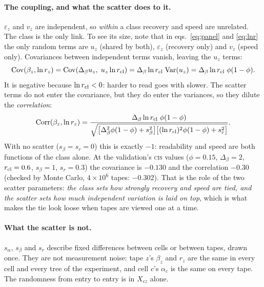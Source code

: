 \paragraph{The coupling, and what the scatter does to it.} $\varepsilon_z$ and $v_z$ are independent,
so \emph{within} a class recovery and speed are unrelated. The class is the only link. To see its size,
note that in eqs.~\eqref{eq:panel} and \eqref{eq:lnr} the only random terms are $u_z$ (shared by both),
$\varepsilon_z$ (recovery only) and $v_z$ (speed only). Covariances between independent terms vanish,
leaving the $u_z$ terms:
\begin{equation}
  \mathrm{Cov}(\beta_z,\ln r_z)=\mathrm{Cov}(\Delta_\beta u_z,\;u_z\ln r_{\rm cl})
  =\Delta_\beta\ln r_{\rm cl}\;\mathrm{Var}(u_z)
  =\Delta_\beta\ln r_{\rm cl}\;\phi(1-\phi) .
  \label{eq:latentcov}
\end{equation}
It is negative because $\ln r_{\rm cl}<0$: harder to read goes with slower. The scatter terms do not
enter the covariance, but they do enter the variances, so they dilute the \emph{correlation}:
\begin{equation}
  \mathrm{Corr}(\beta_z,\ln r_z)=\frac{\Delta_\beta\ln r_{\rm cl}\;\phi(1-\phi)}
  {\sqrt{\big[\Delta_\beta^2\phi(1-\phi)+s_\beta^2\big]\big[(\ln r_{\rm cl})^2\phi(1-\phi)+s_r^2\big]}} .
  \label{eq:latentcorr}
\end{equation}
With no scatter ($s_\beta=s_r=0$) this is exactly $-1$: readability and speed are both functions of
the class alone. At the validation's \textsc{cis} values ($\phi=0.15$, $\Delta_\beta=2$,
$r_{\rm cl}=0.6$, $s_\beta=1$, $s_r=0.3$) the covariance is $-0.130$ and the correlation $-0.30$
(checked by Monte Carlo, $4\times10^6$ tapes: $-0.302$). That is the role of the two scatter
parameters: \emph{the class sets how strongly recovery and speed are tied, and the scatter sets how much
independent variation is laid on top}, which is what makes the tie look loose when tapes are viewed
one at a time.

\paragraph{What the scatter is not.} $s_\alpha$, $s_\beta$ and $s_r$ describe fixed differences between
cells or between tapes, drawn once. They are not measurement noise: tape $z$'s $\beta_z$ and $r_z$ are
the same in every cell and every tree of the experiment, and cell $c$'s $\alpha_c$ is the same on every
tape. The randomness from entry to entry is in $X_{cz}$ alone.

